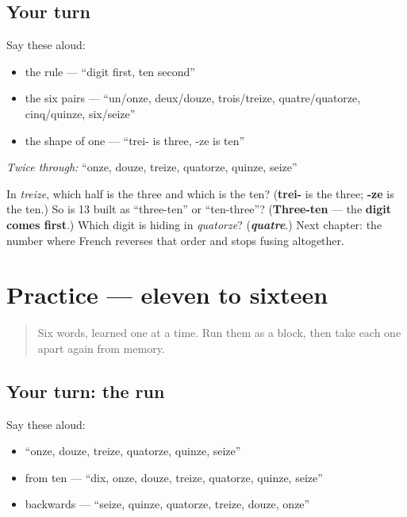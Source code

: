 \subsection*{Your turn}
Say these aloud:

\begin{itemize}
\raggedright
  \item the rule — \textquotedblleft{}digit first, ten second\textquotedblright{}
  \item the six pairs — \textquotedblleft{}un/onze, deux/douze, trois/treize, quatre/quatorze, cinq/quinze, six/seize\textquotedblright{}
  \item the shape of one — \textquotedblleft{}trei- is three, -ze is ten\textquotedblright{}
\end{itemize}

\emph{Twice through:} \textquotedblleft{}onze, douze, treize, quatorze, quinze, seize\textquotedblright{}

\begin{tcolorbox}[breakable,colback=teal!4,colframe=teal!35!black,title={Before you move on}]
In \emph{treize}, which half is the three and which is the ten? (\textbf{trei-} is the three; \textbf{-ze} is the ten.) So is 13 built as \textquotedblleft{}three-ten\textquotedblright{} or \textquotedblleft{}ten-three\textquotedblright{}? (\textbf{Three-ten} — the \textbf{digit comes first}.) Which digit is hiding in \emph{quatorze}? (\emph{\textbf{quatre}}.) Next chapter: the number where French reverses that order and stops fusing altogether.
\end{tcolorbox}
\section[Practice]{Practice — eleven to sixteen}

\label{lesson:FR-C12-practice-teens}



\begin{quote}
Six words, learned one at a time. Run them as a block, then take each one apart again from memory.
\end{quote}

\subsection*{Your turn: the run}
Say these aloud:

\begin{itemize}
\raggedright
  \item \textquotedblleft{}onze, douze, treize, quatorze, quinze, seize\textquotedblright{}
  \item from ten — \textquotedblleft{}dix, onze, douze, treize, quatorze, quinze, seize\textquotedblright{}
  \item backwards — \textquotedblleft{}seize, quinze, quatorze, treize, douze, onze\textquotedblright{}
\end{itemize}

